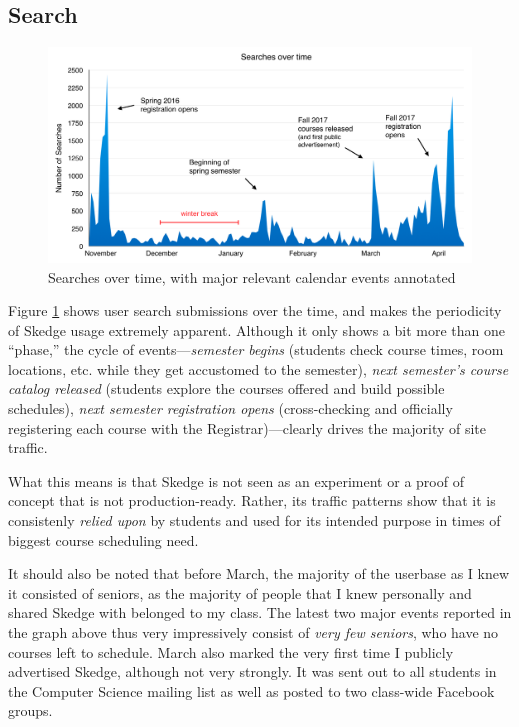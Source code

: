 \subsection{Search}

\begin{figure}[H]
  \centering

  \includegraphics[width=1.0\textwidth]{images/graph/searches}

  \caption{Searches over time, with major relevant calendar events annotated}
  \label{fig:searches}

\end{figure}

Figure \ref{fig:searches} shows user search submissions over the time, and makes the periodicity of Skedge usage extremely apparent. Although it only shows a bit more than one ``phase,'' the cycle of events---\emph{semester begins} (students check course times, room locations, etc. while they get accustomed to the semester), \emph{next semester's course catalog released} (students explore the courses offered and build possible schedules), \emph{next semester registration opens} (cross-checking and officially registering each course with the Registrar)---clearly drives the majority of site traffic.

What this means is that Skedge is not seen as an experiment or a proof of concept that is not production-ready. Rather, its traffic patterns show that it is consistenly \emph{relied upon} by students and used for its intended purpose in times of biggest course scheduling need. %

It should also be noted that before March, the majority of the userbase as I knew it consisted of seniors, as the majority of people that I knew personally and shared Skedge with belonged to my class. The latest two major events reported in the graph above thus very impressively consist of \emph{very few seniors}, who have no courses left to schedule. March also marked the very first time I publicly advertised Skedge, although not very strongly. It was sent out to all students in the Computer Science mailing list as well as posted to two class-wide Facebook groups.

